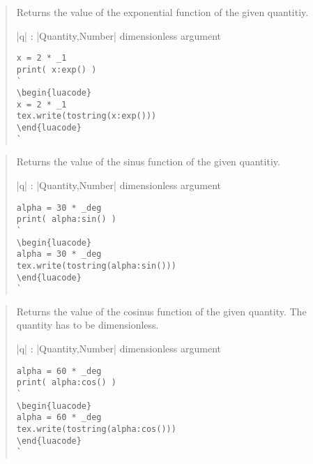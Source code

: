 \documentclass{ltxdoc}
\begin{document}
\begin{quote}
  Returns the value of the exponential function of the given quantitiy.

  \begin{description}
  \item |q| : |Quantity,Number| dimensionless argument
  \end{description}

\begin{lstlisting}
x = 2 * _1
print( x:exp() )
`
\begin{luacode}
x = 2 * _1
tex.write(tostring(x:exp()))
\end{luacode}
`
\end{lstlisting}

\end{quote}



\begin{quote}
  Returns the value of the sinus function of the given quantitiy.

  \begin{description}
  \item |q| : |Quantity,Number| dimensionless argument
  \end{description}

\begin{lstlisting}
alpha = 30 * _deg
print( alpha:sin() )
`
\begin{luacode}
alpha = 30 * _deg
tex.write(tostring(alpha:sin()))
\end{luacode}
`
\end{lstlisting}

\end{quote}



\begin{quote}
  Returns the value of the cosinus function of the given quantity. The quantity has to be dimensionless.

  \begin{description}
  \item |q| : |Quantity,Number| dimensionless argument
  \end{description}

\begin{lstlisting}
alpha = 60 * _deg
print( alpha:cos() )
`
\begin{luacode}
alpha = 60 * _deg
tex.write(tostring(alpha:cos()))
\end{luacode}
`
\end{lstlisting}

\end{quote}
\end{document}
